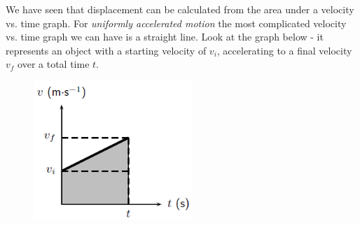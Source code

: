           
          \label{m38796*id76415}We have seen that displacement can be calculated from the area under a velocity vs. time graph. For \textsl{uniformly accelerated motion} the most complicated velocity vs. time graph we can have is a straight line. Look at the graph below - it represents an object with a starting velocity of \textsl{\begin{math}{v}_{i}\end{math}}, accelerating to a final velocity \textsl{\begin{math}{v}_{f}\end{math}} over a total time \textsl{\begin{math}t\end{math}}.\par 
          \label{m38796*id76474}
            
    \setcounter{subfigure}{0}


	\begin{figure}[H] %
    \begin{center}
    \label{m38796*id76477!!!underscore!!!media}\label{m38796*id76477!!!underscore!!!printimage}\includegraphics[width=6cm]{col11305.imgs/m38796_PG10C2_045.png} %
        
      \vspace{2pt}
    \vspace{.1in}
    
    \end{center}

 \end{figure}   

    \addtocounter{footnote}{-0}
    

